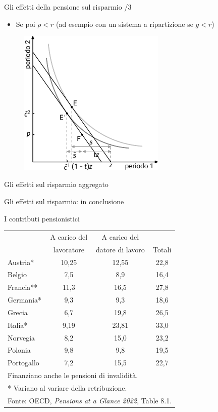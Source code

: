 \documentclass[11pt]{beamer}
\begin{document}
\begin{frame}{Gli effetti della pensione sul risparmio /3}
\begin{itemize}
\item Se poi \(\rho<r\) (ad esempio con un sistema a ripartizione se \(g<r\))
\end{itemize}

\begin{figure}[htbp]
\centering
\includegraphics[height=7cm]{./figure/effetti-sul-risparmio-5.pdf}
\end{figure}
\end{frame}

\begin{frame}{Gli effetti sul risparmio aggregato}
\end{frame}

\begin{frame}{Gli effetti sul risparmio: in conclusione}
\end{frame}


\begin{frame}{I contributi pensionistici}
\begin{tabular}{lccc}
    \toprule
    &A carico del&A carico del&\\[-1mm]
    &lavoratore&datore di lavoro&Totali\\
    \midrule
    Austria* &10,25 &12,55 &22,8\\
    Belgio &7,5 &8,9 &16,4\\
    Francia** &11,3 &16,5 &27,8\\
    Germania* &9,3 &9,3 &18,6\\
    Grecia &6,7 &19,8 &26,5\\
    Italia* &9,19 &23,81 &33,0\\
    Norvegia &8,2 &15,0 &23,2\\
    Polonia &9,8 &9,8 &19,5\\
    Portogallo &7,2 &15,5 &22,7\\
  \bottomrule
\multicolumn{4}{l}{\scriptsize * Finanziano anche le pensioni di invalidità.}\\[-5pt]  
\multicolumn{4}{l}{\scriptsize ** Variano al variare della retribuzione.}\\
\multicolumn{4}{r}{\scriptsize Fonte: OECD, \emph{Pensions at a Glance 2022}, Table 8.1.}\\  
  \end{tabular}
\end{frame}
\end{document}
